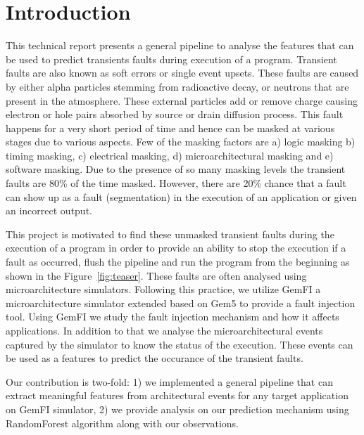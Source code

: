 \section{Introduction}
This technical report presents a general pipeline to analyse the features that can be used to predict transients faults during execution of a program. Transient faults are also known as soft errors or single event upsets. These faults are caused by either alpha particles stemming from radioactive decay, or neutrons that are present in the atmosphere. These external particles add or remove charge causing electron or hole pairs absorbed by source or drain diffusion process. This fault happens for a very short period of time and hence can be masked at various stages due to various aspects. Few of the masking factors are a) logic masking b) timing masking, c) electrical masking, d) microarchitectural masking and e) software masking. Due to the presence of so many masking levels the transient faults are 80\% of the time masked. However, there are 20\% chance that a fault can show up as a fault (segmentation) in the execution of an application or given an incorrect output.

This project is motivated to find these unmasked transient faults during the execution of a program in order to provide an ability to stop the execution if a fault as occurred, flush the pipeline and run the program from the beginning as shown in the Figure~\ref{fig:teaser}. These faults are often analysed using microarchitecture simulators. Following this practice, we utilize GemFI \cite{parasyris2014gemfi} a microarchitecture simulator extended based on Gem5 \cite{Binkert:2011:GS:2024716.2024718} to provide a fault injection tool. Using GemFI we study the fault injection mechanism and how it affects applications. In addition to that we analyse the microarchitectural events captured by the simulator to know the status of the execution. These events can be used as a features to predict the occurance of the transient faults.

Our contribution is two-fold: 1) we implemented a general pipeline that can extract meaningful features from architectural events for any target application on GemFI simulator, 2) we provide analysis on our prediction mechanism using RandomForest algorithm along with our observations.

